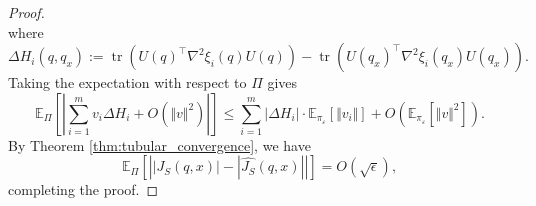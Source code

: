 \documentclass[10pt,a4paper]{amsart}
\begin{document}
\begin{proof}
\begin{equation}
\end{equation}
where 
\begin{equation}\nonumber
    \Delta H_i(q, q_x) := \operatorname{tr}(U(q)^\top \nabla^2\xi_i(q) U(q)) - \operatorname{tr}(U(q_x)^\top \nabla^2\xi_i(q_x) U(q_x)).
\end{equation}
Taking the expectation with respect to $\Pi$ gives
\begin{equation}\nonumber
\mathbb{E}_{\Pi} [ | \sum_{i=1}^m v_i \Delta H_i + O(\Vert v\Vert^2) |] \le \sum_{i=1}^m \vert\Delta H_i\vert \cdot \mathbb{E}_{\pi_\varepsilon}[\Vert v_i\Vert] + O(\mathbb E_{\pi_\varepsilon}[\Vert v\Vert^2]).
\end{equation}
By Theorem \ref{thm:tubular_convergence}, we have 
\begin{equation}\nonumber
\mathbb{E}_{\Pi} \left[ \left| |J_S(q,x)| - |\widehat{J_S}(q,x)| \right| \right] = O(\sqrt{\epsilon}),
\end{equation}
completing the proof.
\end{proof}
\end{document}
